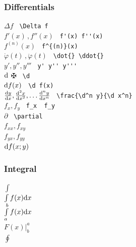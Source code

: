 \subsubsection{Differentials}
\begin{tabbing}
\mySymbols
 $\Delta f $            \>                     \> \verb` \Delta f  `  \\
 $f'(x)\, , f''(x) $    \>                     \> \verb` f'(x) f''(x) `  \\
 $f^{(n)}(x) $          \>                     \> \verb` f^{(n)}(x)  `  \\
 $\dot{\varphi}(t)\, ,\ddot{\varphi}(t)$
                        \>                     \> \verb` \dot{} \ddot{}`  \\
 $y',y'',y''' $         \>                     \> \verb` y' y'' y''' `  \\
 $ \mathrm{d} $                 \>                     \> $\maltese$ \verb` \d ` \\
 $\mathrm{d} f(x) $             \>                     \> \verb` \d f(x)  `  \\
 $\frac{\mathrm{d} y}{\mathrm{d} x},\frac{\mathrm{d}^2 x}{\mathrm{d} x^2},\dots \frac{\mathrm{d}^n y}{\mathrm{d} x^n} $ 
                        \>                     \> \verb` \frac{\d^n y}{\d x^n}  `  \\
 $f_x , f_y$            \>                     \> \verb` f_x  f_y  `  \\
 $\partial $            \>                     \> \verb` \partial  `  \\
 $f_{xx} , f_{xy} $     \>                     \> \verb`   `  \\
 $f_{yx} , f_{yy} $     \>                     \> \verb`   `  \\
 $\mathrm{d} f(x;y) $           \>                     \> \verb`   `  \\
\end{tabbing}

\subsubsection{Integral}
\begin{tabbing}
\mySymbols
 $\int $                \>                     \> \verb`   `  \\
 $\int f(x) \mathrm{d} x $      \>                     \> \verb`   `  \\
 $\int\limits^b_a f(x) \mathrm{d} x $
                        \>                     \> \verb`   `  \\
 $F(x)\big|^a_b $       \>                     \> \verb`   `  \\
 $\oint $               \>                     \> \verb`   `  \\
\end{tabbing}

